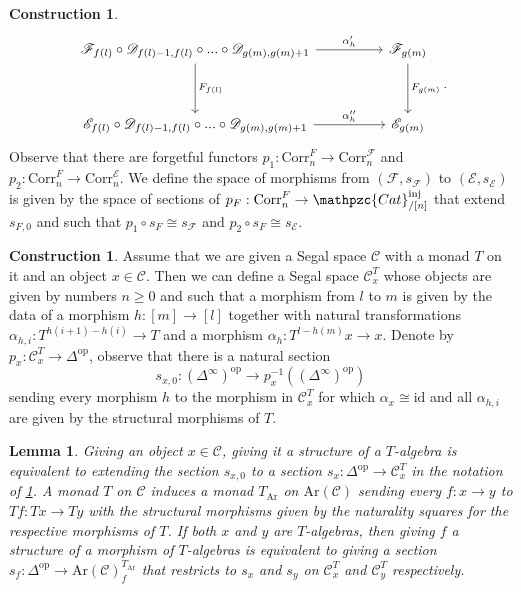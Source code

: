 \documentclass[a4paper, reqno]{amsart}
\newtheorem{lemma}[theorem]{Lemma}
\theoremstyle{definition}
\newtheorem{construction}[theorem]{Construction}
\newcommand\cC{\mathscr C}
\newcommand\cD{\mathscr D}
\newcommand\cE{\mathscr E}
\newcommand\cF{\mathscr F}
\newcommand\id{\mathrm{id}}
\newcommand\inj{\mathrm{inj}}
\newcommand\op{\mathrm{op}}
\newcommand\ccat{\mathpzc{Cat}}
\newcommand\arr{\mathrm{Ar}}
\newcommand\corr{\mathrm{Corr}}
\begin{document}
\begin{construction}
\[
\begin{tikzcd}[row sep=huge, column sep=huge]
\cF_{f(l)}\circ \cD_{f(l)-1,f(l)}\circ...\circ\cD_{g(m),g(m)+1}\arrow[r,"\alpha'_h"]\arrow[d, "F_{f(l)}"]&\cF_{g(m)}\arrow[d, "F_{g(m)}"]\\
\cE_{f(l)}\circ \cD_{f(l)-1,f(l)}\circ...\circ\cD_{g(m),g(m)+1}\arrow[r,"\alpha''_h"]&\cE_{g(m)}
\end{tikzcd}.
\]
Observe that there are forgetful functors $p_1:\corr^F_n\rightarrow\corr^\cF_n$ and $p_2:\corr^F_n\rightarrow\corr^\cE_n$. We define the space of morphisms from $(\cF,s_\cF)$ to $(\cE,s_\cE)$ is given by the space of sections of $p_F:\corr^F_n\rightarrow\ccat^\inj_{/[n]}$ that extend $s_{F,0}$ and such that $p_1\circ s_F\cong s_\cF$ and $p_2\circ s_F\cong s_\cE$.
\end{construction}
\begin{construction}\label{constr:monad_alg}
 Assume that we are given a Segal space $\cC$ with a monad $T$ on it and an object $x\in\cC$. Then we can define a Segal space $\cC^T_x$ whose objects are given by numbers $n\geq0$ and such that a morphism from $l$ to $m$ is given by the data of a morphism $h:[m]\rightarrow[l]$ together  with natural transformations $\alpha_{h,i}:T^{h(i+1)-h(i)}\rightarrow T$ and a morphism $\alpha_h:T^{l-h(m)}x\rightarrow x$. Denote by $p_x:\cC^T_x\rightarrow\Delta^\op$, observe that there is a natural section 
 \[s_{x,0}:(\Delta^{\infty})^\op\rightarrow p_x^{-1}((\Delta^{\infty})^\op)\]
 sending every morphism $h$ to the morphism in $\cC^T_x$ for which $\alpha_x\cong\id$ and all $\alpha_{h,i}$ are given by the structural morphisms of $T$.
\end{construction}
\begin{lemma}\label{lem:monad_alg}
Giving an object $x\in\cC$, giving it a structure of a $T$-algebra is equivalent to extending the section $s_{x,0}$ to a section $s_x:\Delta^\op\rightarrow\cC^T_x$ in the notation of \cref{constr:monad_alg}. A monad $T$ on $\cC$ induces a monad $T_\arr$ on $\arr(\cC)$ sending every $f:x\rightarrow y$ to $Tf:Tx\rightarrow Ty$ with the structural morphisms given by the naturality squares for the respective morphisms of $T$. If both $x$ and $y$ are $T$-algebras, then giving $f$ a structure of a morphism of $T$-algebras is equivalent to giving a section $s_f:\Delta^\op\rightarrow\arr(\cC)_f^{T_\arr}$ that restricts to $s_x$ and $s_y$ on $\cC^T_x$ and $\cC^T_y$ respectively.
\end{lemma}
\end{document}
